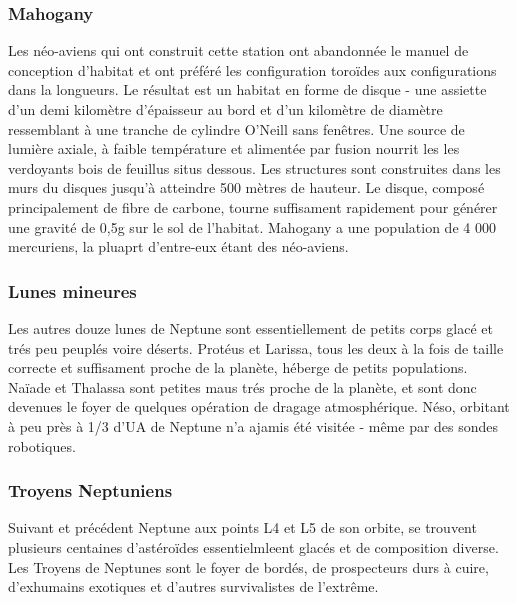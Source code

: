                                                                      \subsubsection{Mahogany} \label{sec:mahogany} 

                                                                     Les néo-aviens qui ont construit cette station ont abandonnée le manuel de conception d'habitat et ont préféré les configuration toroïdes aux configurations dans la longueurs. Le résultat est un habitat en forme de disque - une assiette d'un demi kilomètre d'épaisseur au bord et d'un kilomètre de diamètre ressemblant à une tranche de cylindre O'Neill sans fenêtres. Une source de lumière axiale, à faible température et alimentée par fusion nourrit les les verdoyants bois de feuillus situs dessous. Les structures sont construites dans les murs du disques jusqu'à atteindre 500 mètres de hauteur. Le disque, composé principalement de fibre de carbone, tourne suffisament rapidement pour générer une gravité de 0,5g sur le sol de l'habitat. Mahogany a une population de 4 000 mercuriens, la pluaprt d'entre-eux étant des néo-aviens. 

                                                                     \subsubsection{Lunes mineures} \label{sec:minor-moons} 

                                                                     Les autres douze lunes de Neptune sont essentiellement de petits corps glacé et trés peu peuplés voire déserts. Protéus et Larissa, tous les deux à la fois de taille correcte et suffisament proche de la planète, héberge de petits populations. Naïade et Thalassa sont petites maus trés proche de la planète, et sont donc devenues le foyer de quelques opération de dragage atmosphérique. Néso, orbitant à peu près à 1/3 d'UA de Neptune n'a ajamis été visitée - même par des sondes robotiques. 

                                                                     \subsubsection{Troyens Neptuniens} \label{sec:neptunian-trojans} 

                                                                     Suivant et précédent Neptune aux points L4 et L5 de son orbite, se trouvent plusieurs centaines d'astéroïdes essentielmleent glacés et de composition diverse. Les Troyens de Neptunes sont le foyer de bordés, de prospecteurs durs à cuire, d'exhumains exotiques et d'autres survivalistes de l'extrême. 

